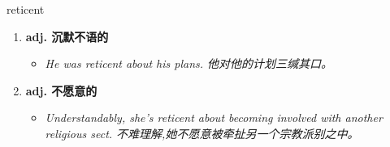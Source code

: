 
\begin{frame}
{\huge reticent}
\begin{center}
\begin{enumerate}\Large
  \item \textbf{adj. 沉默不语的}
  \begin{itemize}
    \item \em{\Large{He was reticent about his plans. 他对他的计划三缄其口。}}
  \end{itemize}
  \item \textbf{adj. 不愿意的}
  \begin{itemize}
    \item \em{\Large{Understandably, she's reticent about becoming involved with another religious sect. 不难理解,她不愿意被牵扯另一个宗教派别之中。}}
  \end{itemize}
\end{enumerate}
\end{center}
\end{frame}
